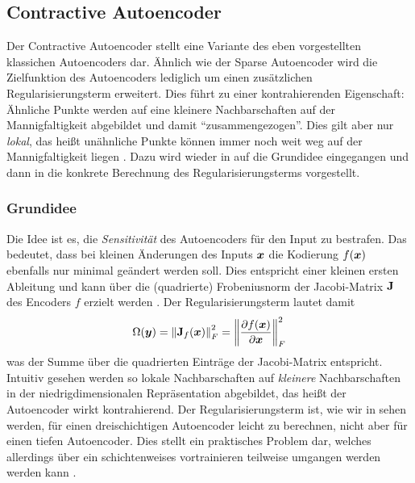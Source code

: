 \subsection{Contractive Autoencoder}
\label{ch:MethodenDerDimRed:ML:CAE}

Der Contractive Autoencoder \parencite{Rifai.2011} stellt eine Variante des eben vorgestellten klassichen Autoencoders
 dar. Ähnlich wie der Sparse Autoencoder wird die
Zielfunktion des Autoencoders lediglich um einen zusätzlichen Regularisierungsterm erweitert. Dies
führt zu einer kontrahierenden Eigenschaft: Ähnliche Punkte werden auf eine kleinere
Nachbarschaften auf der Mannigfaltigkeit abgebildet und damit \enquote{zusammengezogen}. Dies gilt
aber nur \textit{lokal}, das heißt unähnliche Punkte können immer noch weit weg auf der
Mannigfaltigkeit liegen \parencite[521]{Goodfellow.2016}. Dazu wird wieder in 
auf die Grundidee eingegangen und dann in 
die konkrete Berechnung des Regularisierungsterms vorgestellt.

\subsubsection{Grundidee}
\label{ch:MethodenDerDimRed:CAE:Grundidee}
Die Idee ist
es, die \textit{Sensitivität} des Autoencoders für den Input zu bestrafen. Das bedeutet, dass bei
kleinen Änderungen des Inputs $\bm{x}$ die Kodierung $f(\bm{x})$ ebenfalls nur minimal geändert
werden soll. Dies entspricht einer kleinen ersten Ableitung und kann über die (quadrierte)
Frobeniusnorm der Jacobi-Matrix $\mathbf{J}$ des Encoders $f$ erzielt werden \parencites[2]{Rifai.2011}[521]{Goodfellow.2016}. Der Regularisierungsterm lautet damit
\begin{equation}
	\label{eq:CAE-Regularisierung}
	\Omega(\bm{y}) = \left\lVert\mathbf{J}_f(\bm{x})\right\rVert_F^2 =  \left\lVert \frac{\partial f(\bm{x})}{\partial \bm{x}} \right\rVert^2_F
\end{equation}
was der Summe über die quadrierten Einträge der Jacobi-Matrix entspricht. Intuitiv gesehen werden so lokale Nachbarschaften auf \textit{kleinere} Nachbarschaften in der niedrigdimensionalen Repräsentation abgebildet, das heißt der Autoencoder wirkt kontrahierend.
Der Regularisierungsterm ist, wie wir in  sehen werden, für einen dreischichtigen Autoencoder leicht zu berechnen, nicht aber für einen tiefen Autoencoder. Dies stellt ein praktisches Problem dar, welches allerdings über ein schichtenweises vortrainieren teilweise umgangen werden werden kann \parencite[vgl.][522]{Goodfellow.2016}.

